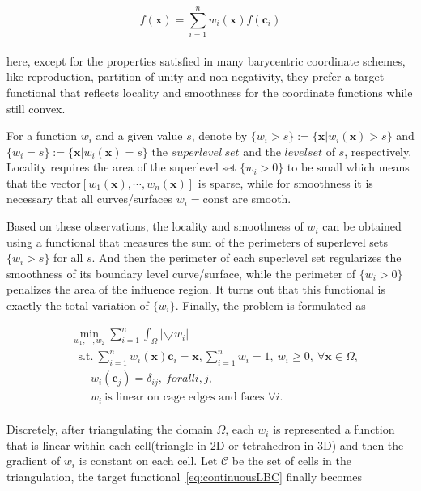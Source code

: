 \small{
\begin{equation}
 \label{eq:BC}
 f(\mathbf{x}) = \sum_{i=1}^{n}w_{i}(\mathbf{x})f(\mathbf{c}_{i})
\end{equation}
}
\\
here, except for the properties satisfied in many barycentric coordinate schemes, like reproduction, partition of unity and non-negativity, they prefer a target functional that reflects locality and smoothness for the coordinate functions while still convex.

For a function $w_{i}$ and a given value $s$, denote by $\{w_{i}>s\}:=\{\mathbf{x}|w_{i}(\mathbf{x})>s\}$ and $\{w_{i}=s\}:=\{\mathbf{x}|w_{i}(\mathbf{x})=s\}$ the $superlevel~set$ and the $level set$ of $s$, respectively.
Locality requires the area of the superlevel set $\{w_{i}>0\}$ to be small which means that the vector$[w_{1}(\mathbf{x}), \cdots, w_{n}(\mathbf{x})]$ is sparse, while for smoothness it is necessary that all curves/surfaces $w_{i}=\textrm{const}$ are smooth.

Based on these observations, the locality and smoothness of $w_{i}$ can be obtained using a functional that measures the sum of the perimeters of superlevel sets $\{w_{i}>s\}$ for all $s$.
And then the perimeter of each superlevel set regularizes the smoothness of its boundary level curve/surface, while the perimeter of $\{w_{i}>0\}$ penalizes the area of the influence region. It turns out that this functional is exactly the total variation of $\{w_{i}\}$. Finally, the problem is formulated as

\small{
\begin{equation}
 \label{eq:continuousLBC}
 \begin{aligned}
 & \min_{w_1, \cdots, w_2} \sum_{i=1}^{n} \int_{\Omega}^{} |\bigtriangledown w_{i}| \\
 & ~~~\mathrm{s.t.}~ \sum_{i=1}^{n}w_{i}(\mathbf{x})\mathbf{c}_{i}=\mathbf{x},
        \sum_{i=1}^{n}w_{i}=1,~w_{i}\geq0,~\forall \mathbf{x}\in\Omega,\\
 & ~~~~~~~~w_{i}(\mathbf{c}_{j})=\delta_{ij},~forall i,j,\\
 & ~~~~~~~~w_{i}~\textrm{is linear on cage edges and faces }\forall i.
 \end{aligned}
\end{equation}
}
\\
Discretely, after triangulating the domain $\Omega$, each $w_{i}$ is represented a function that is linear within each cell(triangle in 2D or tetrahedron in 3D) and then the gradient of $w_{i}$ is constant on each cell. Let $\mathcal{C}$ be the set of cells in the triangulation, the target functional~\ref{eq:continuousLBC} finally becomes

